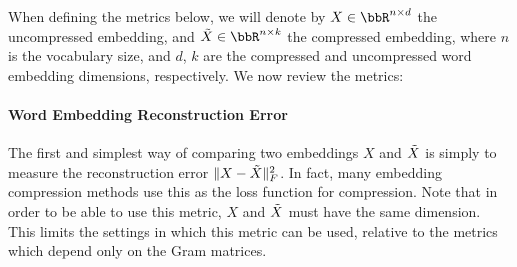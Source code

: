 
When defining the metrics below, we will denote by $X \in \RR^{n\times d}$ the uncompressed embedding, and $\tX \in \RR^{n \times k}$ the compressed embedding, where $n$ is the vocabulary size, and $d$, $k$ are the compressed and uncompressed word embedding dimensions, respectively.
We now review the metrics:



\paragraph{Word Embedding Reconstruction Error}
The first and simplest way of comparing two embeddings $X$ and $\tX$ is simply to measure the reconstruction error $\|X-\tX\|_F^2$.
In fact, many embedding compression methods \citep{andrews16,dccl17} use this as the loss function for compression.
Note that in order to be able to use this metric, $X$ and $\tX$ must have the same dimension.
This limits the settings in which this metric can be used, relative to the metrics which depend only on the Gram matrices.

